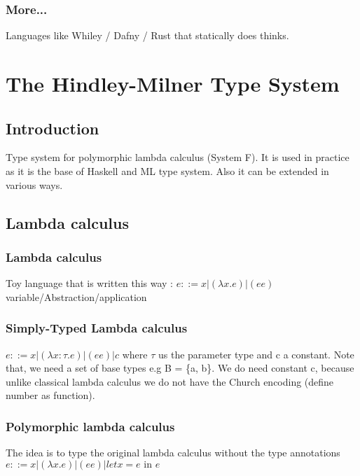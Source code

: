         \subsubsection{More...}
            Languages like Whiley / Dafny / Rust that statically does thinks.
\section{The Hindley-Milner Type System}
    \subsection{Introduction}
        Type system for polymorphic lambda calculus (System F). It is used in
        practice as it is the base of Haskell and ML type system. Also it can be
        extended in various ways.
    \subsection{Lambda calculus}
        \subsubsection{Lambda calculus}
            Toy language that is written this way : 
            $e::= x | (\lambda x.e) | (e e)$ variable/Abstraction/application

        \subsubsection{Simply-Typed Lambda calculus}
         $e::= x | (\lambda x:\tau.e) | (e e) | c$ where $\tau$ us the
        parameter type and c a constant. Note that, we need a set of base types
        e.g B = \{a, b\}. We do need constant c, because unlike classical lambda
        calculus we do not have the Church encoding (define number as function).

        \subsubsection{Polymorphic lambda calculus}
            The idea is to type the original lambda calculus without the type
            annotations \\ $e ::= x | (\lambda x.e) | (e e) | let x = e \text{ in } e$
